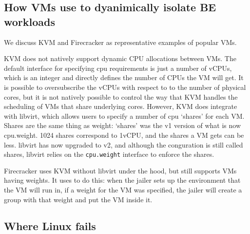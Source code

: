 \subsection{How VMs use \cgroups{} to dyanimically isolate BE workloads}

We discuss KVM and Firecracker as representative examples of popular VMs.

KVM does not natively support dynamic CPU allocations between VMs. The default
interface for specifying cpu requirements is just a number of vCPUs, which is an
integer and directly defines the number of CPUs the VM will get. It is possible
to oversubscribe the vCPUs with respect to to the number of physical cores, but
it is not natively possible to control the way that KVM handles the scheduling
of VMs that share underlying cores. However, KVM does integrate with libvirt,
which allows users to specify a number of cpu `shares' for each VM. Shares are
the same thing as weight: `shares' was the \cgroups{} v1 version of what is now
cpu.weight. 1024 shares correspond to 1vCPU, and the shares a VM gets can be
less. libvirt has now upgraded to \cgroups{} v2, and although the conguration is
still called shares, libvirt relies on the \texttt{cpu.weight} interface to
enforce the shares.

Firecracker uses KVM without libvirt under the hood, but still supports VMs
having weights. It uses \cgroups{} to do this: when the jailer sets up the
environment that the VM will run in, if a weight for the VM was specified, the
jailer will create a group with that weight and put the VM inside it.


\subsection{Where Linux fails}

